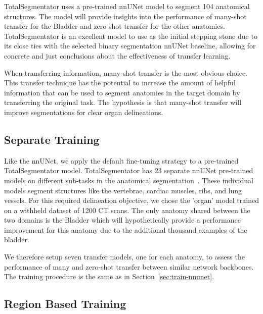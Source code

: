 \documentclass[11pt,twoside]{report}
\begin{document}
TotalSegmentator uses a pre-trained nnUNet model to segment 104 anatomical structures. The model will provide insights into the performance of many-shot transfer for the Bladder and zero-shot transfer for the other anatomies. TotalSegmentator is an excellent model to use as the initial stepping stone due to its close ties with the selected binary segmentation nnUNet baseline, allowing for concrete and just conclusions about the effectiveness of transfer learning.

When transferring information, many-shot transfer is the most obvious choice. This transfer technique has the potential to increase the amount of helpful information that can be used to segment anatomies in the target domain by transferring the original task. The hypothesis is that many-shot transfer will improve segmentations for clear organ delineations. 

\subsection{Separate Training}

Like the nnUNet, we apply the default fine-tuning strategy to a pre-trained TotalSegmentator model. TotalSegmentator has 23 separate nnUNet pre-trained models on different sub-tasks in the anatomical segmentation~\cite{totalsegmentor-git}. These individual models segment structures like the vertebrae, cardiac muscles, ribs, and lung vessels. For this required delineation objective, we chose the 'organ' model trained on a withheld dataset of 1200 CT scans. The only anatomy shared between the two domains is the Bladder which will hypothetically provide a performance improvement for this anatomy due to the additional thousand examples of the bladder.

We therefore setup seven transfer models, one for each anatomy, to assess the performance of many and zero-shot transfer between similar network backbones. The training procedure is the same as in Section~\ref{sec:train-nnunet}.

\subsection{Region Based Training}
\end{document}
